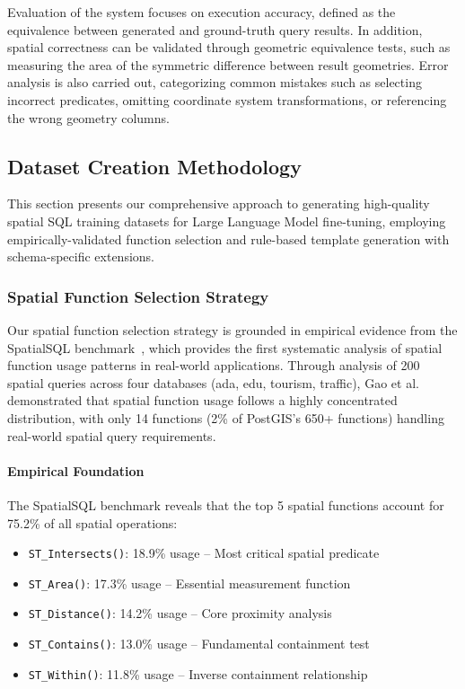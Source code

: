Evaluation of the system focuses on execution accuracy, defined as the equivalence between generated and ground-truth query results. In addition, spatial correctness can be validated through geometric equivalence tests, such as measuring the area of the symmetric difference between result geometries. Error analysis is also carried out, categorizing common mistakes such as selecting incorrect predicates, omitting coordinate system transformations, or referencing the wrong geometry columns.

\subsection{Dataset Creation Methodology}
\label{subsec:dataset-creation}

This section presents our comprehensive approach to generating high-quality spatial SQL training datasets for Large Language Model fine-tuning, employing empirically-validated function selection and rule-based template generation with schema-specific extensions.

\subsubsection{Spatial Function Selection Strategy}
\label{subsubsec:function-selection}

Our spatial function selection strategy is grounded in empirical evidence from the SpatialSQL benchmark~\cite{gao2024text}, which provides the first systematic analysis of spatial function usage patterns in real-world applications. Through analysis of 200 spatial queries across four databases (ada, edu, tourism, traffic), Gao et al.~\cite{gao2024text} demonstrated that spatial function usage follows a highly concentrated distribution, with only 14 functions (2\% of PostGIS's 650+ functions) handling real-world spatial query requirements.

\paragraph{Empirical Foundation}
The SpatialSQL benchmark reveals that the top 5 spatial functions account for 75.2\% of all spatial operations:
\begin{itemize}
    \item \texttt{ST\_Intersects()}: 18.9\% usage -- Most critical spatial predicate
    \item \texttt{ST\_Area()}: 17.3\% usage -- Essential measurement function
    \item \texttt{ST\_Distance()}: 14.2\% usage -- Core proximity analysis
    \item \texttt{ST\_Contains()}: 13.0\% usage -- Fundamental containment test
    \item \texttt{ST\_Within()}: 11.8\% usage -- Inverse containment relationship
\end{itemize}

